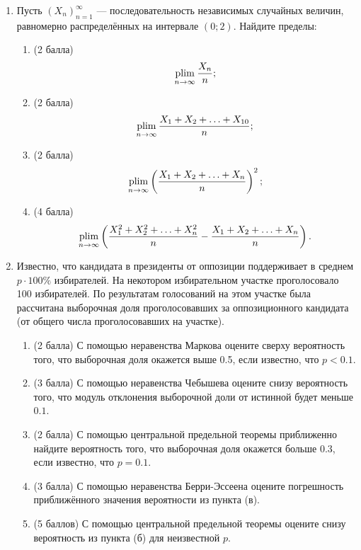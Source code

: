 \begin{enumerate}
  \item Пусть $(X_n)_{n=1}^{\infty}$ — последовательность независимых случайных величин, равномерно распределённых на интервале $(0; 2)$. 
  Найдите пределы:
  
  \begin{enumerate}
      \item (2 балла) 
      \[
          \operatorname*{plim}_{n\to\infty} \frac{X_n}{n};
      \]
      \item (2 балла) 
      \[ 
          \operatorname*{plim}_{n\to\infty} \frac{X_1 + X_2 + \ldots + X_{10}}{n};
      \]
      \item (2 балла) 
      \[
           \operatorname*{plim}_{n\to\infty} \left(\frac{X_1 + X_2 + \ldots + X_n}{n}\right)^2;
           \]
      
      \item (4 балла) 
      \[
           \operatorname*{plim}_{n\to\infty} \left(\frac{X_1^2 + X_2^2 + \ldots + X_{n}^2}{n} - \frac{X_1 + X_2 + \ldots + X_{n}}{n}\right).
           \]
  \end{enumerate}
  
  \item Известно, что кандидата в президенты от оппозиции поддерживает в среднем $p\cdot 100\%$ избирателей. 
  На некотором избирательном участке проголосовало 100 избирателей. 
  По результатам голосований на этом участке была рассчитана выборочная доля проголосовавших 
  за оппозиционного кандидата (от общего числа проголосовавших на участке).
  
  \begin{enumerate}
      \item (2 балла) С помощью неравенства Маркова оцените сверху вероятность того, 
      что выборочная доля окажется выше 0.5, если известно, что $p<0.1$.
      \item (3 балла) С помощью неравенства Чебышева оцените снизу вероятность того, 
      что модуль отклонения выборочной доли от истинной будет меньше $0.1$.
      \item (2 балла) С помощью центральной предельной теоремы приближенно найдите вероятность того, 
      что выборочная доля окажется больше 0.3, если известно, что $p=0.1$.
      \item (3 балла) С помощью неравенства Берри-Эссеена оцените погрешность приближённого значения вероятности из пункта (в).
      \item (5 баллов) С помощью центральной предельной теоремы оцените снизу вероятность из пункта (б) для неизвестной $p$.
  \end{enumerate}
  
  \end{enumerate}


